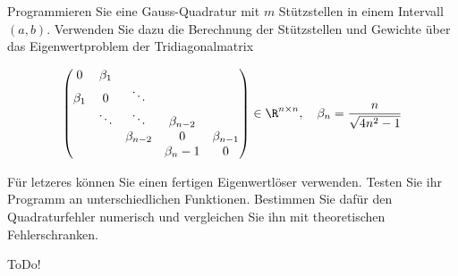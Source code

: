
\begin{exercise}

Programmieren Sie eine Gauss-Quadratur mit $m$ Stützstellen in einem Intervall $(a,b)$.
Verwenden Sie dazu die Berechnung der Stützstellen und Gewichte über das Eigenwertproblem der
Tridiagonalmatrix

\begin{align}
  \begin{pmatrix}
  0 & \beta_1 & & & \\
  \beta_1 & 0 & \ddots & & \\
  & \ddots & \ddots & \beta_{n-2} & \\
  & & \beta_{n-2} & 0 & \beta_{n-1} \\
  & & & \beta_n-1 & 0
  \end{pmatrix}
  \in \R^{n \times n}, \quad
  \beta_n = \frac{n}{\sqrt{4n^2 -1}}
\end{align}

Für letzeres können Sie einen fertigen Eigenwertlöser verwenden. Testen Sie ihr Programm an
unterschiedlichen Funktionen. Bestimmen Sie dafür den Quadraturfehler numerisch und vergleichen
Sie ihn mit theoretischen Fehlerschranken.
\end{exercise}


\begin{solution}

ToDo!

\end{solution}

